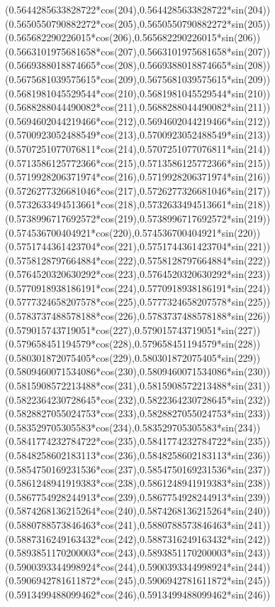 {({0.5644285633828722*cos(204)},{0.5644285633828722*sin(204)})
({0.5650550790882272*cos(205)},{0.5650550790882272*sin(205)})
({0.565682290226015*cos(206)},{0.565682290226015*sin(206)})
({0.5663101975681658*cos(207)},{0.5663101975681658*sin(207)})
({0.5669388018874665*cos(208)},{0.5669388018874665*sin(208)})
({0.5675681039575615*cos(209)},{0.5675681039575615*sin(209)})
({0.5681981045529544*cos(210)},{0.5681981045529544*sin(210)})
({0.5688288044490082*cos(211)},{0.5688288044490082*sin(211)})
({0.5694602044219466*cos(212)},{0.5694602044219466*sin(212)})
({0.5700923052488549*cos(213)},{0.5700923052488549*sin(213)})
({0.5707251077076811*cos(214)},{0.5707251077076811*sin(214)})
({0.5713586125772366*cos(215)},{0.5713586125772366*sin(215)})
({0.5719928206371974*cos(216)},{0.5719928206371974*sin(216)})
({0.5726277326681046*cos(217)},{0.5726277326681046*sin(217)})
({0.5732633494513661*cos(218)},{0.5732633494513661*sin(218)})
({0.5738996717692572*cos(219)},{0.5738996717692572*sin(219)})
({0.574536700404921*cos(220)},{0.574536700404921*sin(220)})
({0.5751744361423704*cos(221)},{0.5751744361423704*sin(221)})
({0.5758128797664884*cos(222)},{0.5758128797664884*sin(222)})
({0.5764520320630292*cos(223)},{0.5764520320630292*sin(223)})
({0.5770918938186191*cos(224)},{0.5770918938186191*sin(224)})
({0.5777324658207578*cos(225)},{0.5777324658207578*sin(225)})
({0.5783737488578188*cos(226)},{0.5783737488578188*sin(226)})
({0.579015743719051*cos(227)},{0.579015743719051*sin(227)})
({0.579658451194579*cos(228)},{0.579658451194579*sin(228)})
({0.580301872075405*cos(229)},{0.580301872075405*sin(229)})
({0.5809460071534086*cos(230)},{0.5809460071534086*sin(230)})
({0.5815908572213488*cos(231)},{0.5815908572213488*sin(231)})
({0.5822364230728645*cos(232)},{0.5822364230728645*sin(232)})
({0.5828827055024753*cos(233)},{0.5828827055024753*sin(233)})
({0.583529705305583*cos(234)},{0.583529705305583*sin(234)})
({0.5841774232784722*cos(235)},{0.5841774232784722*sin(235)})
({0.5848258602183113*cos(236)},{0.5848258602183113*sin(236)})
({0.5854750169231536*cos(237)},{0.5854750169231536*sin(237)})
({0.5861248941919383*cos(238)},{0.5861248941919383*sin(238)})
({0.5867754928244913*cos(239)},{0.5867754928244913*sin(239)})
({0.5874268136215264*cos(240)},{0.5874268136215264*sin(240)})
({0.5880788573846463*cos(241)},{0.5880788573846463*sin(241)})
({0.5887316249163432*cos(242)},{0.5887316249163432*sin(242)})
({0.5893851170200003*cos(243)},{0.5893851170200003*sin(243)})
({0.5900393344998924*cos(244)},{0.5900393344998924*sin(244)})
({0.5906942781611872*cos(245)},{0.5906942781611872*sin(245)})
({0.5913499488099462*cos(246)},{0.5913499488099462*sin(246)})
}
